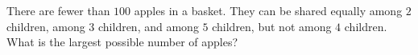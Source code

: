 There are fewer than $100$ apples in a basket. They can be shared equally among $2$ children, among $3$ children, and among $5$ children, but not among $4$ children. What is the largest possible number of apples?
